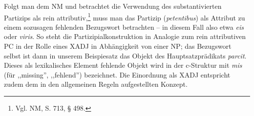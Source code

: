 \documentclass[12pt,a4paper]{article}
\begin{document}
Folgt man dem NM und betrachtet die Verwendung des substantivierten Partizips als rein attributiv,\footnote{Vgl. NM, S. 713, § 498.} muss man das Partizip (\textit{petentibus}) als Attribut zu einem sozusagen fehlenden Bezugswort betrachten -- in diesem Fall also etwa \textit{eis} oder \textit{viris}. So steht die Partizipialkonstruktion in Analogie zum rein attributiven PC in der Rolle eines XADJ in Abhängigkeit von einer NP; das Bezugswort selbst ist dann in unserem Beispiesatz das Objekt des Hauptsatzprädikats \textit{parcit}. Dieses als lexikalisches Element fehlende Objekt wird in der c-Struktur mit \textit{mis} (für ,,missing'', ,,fehlend'') bezeichnet.  
Die Einordnung als XADJ entspricht zudem dem in den allgemeinen Regeln aufgestellten Konzept.
\end{document}
